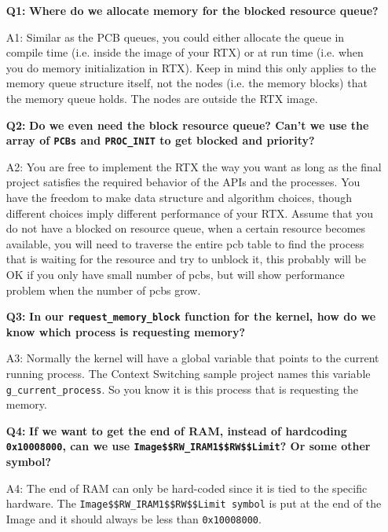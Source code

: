 \begin{itemize}
\item[{\bf Q1:}] {\bf Where do we allocate memory for the blocked resource queue?}
\item[A1:] 
Similar as the PCB queues, you could either allocate the queue in compile time (i.e. inside the image of your RTX) or at run time (i.e. when you do memory initialization in RTX). Keep in mind this only applies to the memory queue structure itself, not the nodes (i.e. the memory blocks) that the memory queue holds. The nodes are outside the RTX image. 

\item[{\bf Q2:}] {\bf Do we even need the block resource queue? Can't we use the array of \verb+PCBs+ and \verb+PROC_INIT+ to get blocked and priority?} 
\item[A2:] 
You are free to implement the RTX the way you want as long as the final project satisfies the required behavior of the APIs and the processes. You have the freedom to make data structure and algorithm choices, though different choices imply different performance of your RTX. Assume that you do not have a blocked on resource queue, when a certain resource becomes available, you will need to traverse the entire pcb table to find the process that is waiting for the resource and try to unblock it, this probably will be OK if you only have small number of pcbs, but will show performance problem when the number of pcbs grow. 

\item[{\bf Q3:}] {\bf In our \verb+request_memory_block+ function for the kernel, how do we know which process is requesting memory?}
\item[A3:] 
  Normally the kernel will have a global variable that points to the current running process. The Context Switching sample project names this variable \\
  \verb+g_current_process+. So you know it is this process that is requesting the memory.

\item[{\bf Q4:}] {\bf If we want to get the end of RAM, instead of hardcoding \verb+0x10008000+, 
can we use \verb+Image$$RW_IRAM1$$RW$$Limit+? Or some other symbol?}
\item[A4:]
The end of RAM can only be hard-coded since it is tied to the specific hardware. The \verb+Image$$RW_IRAM1$$RW$$Limit symbol+ is put at the end of the Image and it should always be less than \verb+0x10008000+.


\end{itemize}
